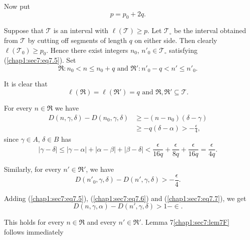 Now put
$$
p = p_{0} + 2q.
$$

Suppose that $\mathscr{T}$ is an interval with $\ell (\mathscr{T}) \geq p$. Let $\mathscr{T}_{\circ}$ be the interval obtained from $\mathscr{T}$ by cutting off segments of length $q$ on either side. Then clearly $\ell (\mathscr{T}_{0}) \geq p_{0}$. Hence there exist integers $n_{0}$, $n'_{0} \in \mathscr{T}_{\circ}$ satisfying (\ref{chap1:sec7:eq7.5}). Set
$$
\mathfrak{R} : n_{0} < n \leq n_{0} + q \text{ and }\mathfrak{R}' : n'_{0} - q < n' \leq n'_{0}.
$$

It is clear that 
$$
\ell (\mathfrak{R}) = \ell(\mathfrak{R}') = q \text{ and } \mathfrak{R}, \mathfrak{R}' \subseteq \mathscr{T}.
$$

For every $n \in \mathfrak{R}$ we have
\begin{align*}
D(n, \gamma, \delta) - D(n_{0}, \gamma, \delta) & \geq -(n - n_{0}) (\delta - \gamma)\\
& \geq -q (\delta - \alpha) > - \frac{\epsilon}{4},\tag{7.6}\label{chap1:sec7:eq7.6}
\end{align*}
since $\gamma \in A$, $\delta \in B$ has
$$
|\gamma - \delta| \leq |\gamma - \alpha| + |\alpha - \beta| + |\beta - \delta| < \frac{\epsilon}{16q} + \frac{\epsilon}{8q} + \frac{\epsilon}{16q} = \frac{\epsilon}{4q}.
$$

Similarly, for every $n' \in \mathfrak{R}'$, we have
\begin{equation*}
D(n'_{0}, \gamma, \delta) - D(n', \gamma, \delta) > - \frac{\epsilon}{4}.\tag{7.7}\label{chap1:sec7:eq7.7}
\end{equation*}

Adding (\ref{chap1:sec7:eq7.5}), (\ref{chap1:sec7:eq7.6}) and (\ref{chap1:sec7:eq7.7}), we get 
$$
D(n, \gamma, \alpha) - D(n', \gamma, \delta) > 1 - \in.
$$\pageoriginale

This holds for every $n \in \mathfrak{R}$ and every $n' \in
\mathfrak{R}'$. Lemma 7\ref{chap1:sec7:lem7F} follows immediately

